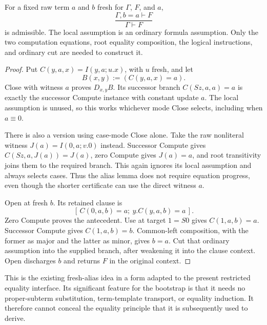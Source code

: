 \begin{lemma}
\label{lem:rp-alias}
For a fixed raw term $a$ and $b$ fresh for $\Gamma$, $F$, and $a$,
\[
 \frac{\Gamma,b=a\vdash F}{\Gamma\vdash F}
 \tag{Alias}
\]
is admissible.  The local assumption is an ordinary formula assumption.
Only the two computation equations, root equality composition, the
logical instructions, and ordinary cut are needed to construct it.
\end{lemma}
\begin{proof}
Put $C(y,a,x)=I(y,a;u.x)$, with $u$ fresh, and let
\[
 B(x,y):=(C(y,a,x)=a).
\]
Close with witness $a$ proves $D_{x,y}B$.  Its successor branch
$C(Sz,a,a)=a$ is exactly the successor Compute instance with constant
update $a$.  The local assumption is unused, so this works whichever
mode Close selects, including when $a\equiv0$.

There is also a version using case-mode Close alone.  Take the raw
nonliteral witness $J(a)=I(0,a;v.0)$ instead.  Successor Compute gives
$C(Sz,a,J(a))=J(a)$, zero Compute gives $J(a)=a$, and root transitivity
joins them to the required branch.  This again ignores its local
assumption and always selects cases.  Thus the alias lemma does not
require equation progress, even though the shorter certificate can
use the direct witness $a$.

Open at fresh $b$.  Its retained clause is
\[
 [\,C(0,a,b)=a;\ y.C(y,a,b)=a\,].
\]
Zero Compute proves the antecedent.  Use at target $1=S0$ gives
$C(1,a,b)=a$.  Successor Compute gives $C(1,a,b)=b$.
Common-left composition, with the former as major and the latter as
minor, gives $b=a$.  Cut that ordinary assumption into the supplied
branch, after weakening it into the clause context.  Open discharges
$b$ and returns $F$ in the original context.
\end{proof}

This is the existing fresh-alias idea in a form adapted to the present
restricted equality interface.  Its significant feature for the
bootstrap is that it needs no proper-subterm substitution, term-template
transport, or equality induction.  It therefore cannot conceal the
equality principle that it is subsequently used to derive.


